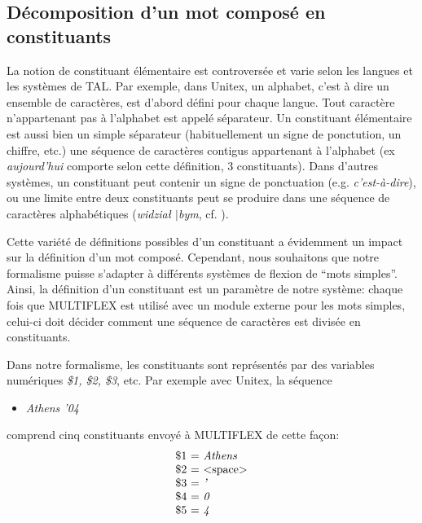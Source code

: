 \subsection{Décomposition d'un mot composé en constituants}
\label{subsec:decomp}
La notion de constituant élémentaire est controversée et varie selon les langues et les systèmes de
TAL. Par exemple, dans Unitex, un alphabet, c'est à dire un ensemble de caractères, est d'abord
défini pour chaque langue.  Tout caractère n'appartenant pas à l'alphabet est appelé séparateur. Un
constituant élémentaire est aussi bien un simple séparateur (habituellement un signe de ponctution,
un chiffre, etc.) une séquence de caractères contigus appartenant à l'alphabet (ex
\emph{aujourd'hui} comporte selon cette définition, 3 constituants). Dans d'autres systèmes, un
constituant peut contenir un signe de ponctuation (e.g. \emph{c'est-\`a-dire}), ou une limite entre
deux constituants peut se produire dans une séquence de caractères alphabétiques (\emph{widzia\l
$\mid$bym}, cf.
\cite{PrzepWol03}). 

\bigskip
\noindent Cette variété de définitions possibles d'un constituant a évidemment un impact sur la
définition d'un mot composé. Cependant, nous souhaitons que notre formalisme  puisse s'adapter à
différents systèmes de flexion de ``mots simples''. Ainsi, la définition d'un constituant est un
paramètre de notre système: chaque fois que MULTIFLEX est utilisé avec un module externe pour les
mots simples, celui-ci doit décider comment une séquence de caractères est divisée en constituants.

\bigskip
\noindent Dans notre formalisme, les constituants sont représentés par des variables numériques
\emph{\$1, \$2, \$3}, etc. 
Par exemple avec Unitex, la séquence

\begin{itemize}
\item \emph{Athens '04}
\end{itemize} 

\bigskip
\noindent comprend cinq constituants envoyé à MULTIFLEX de cette façon:
\[
\begin{array}[c]{l}
$\$1 = \emph{Athens}$ \\
$\$2 = $<$space$>$$ \\
$\$3 = \emph{'}$ \\
$\$4 = \emph{0}$ \\
$\$5 = \emph{4}$ \\
\end{array}
\]

